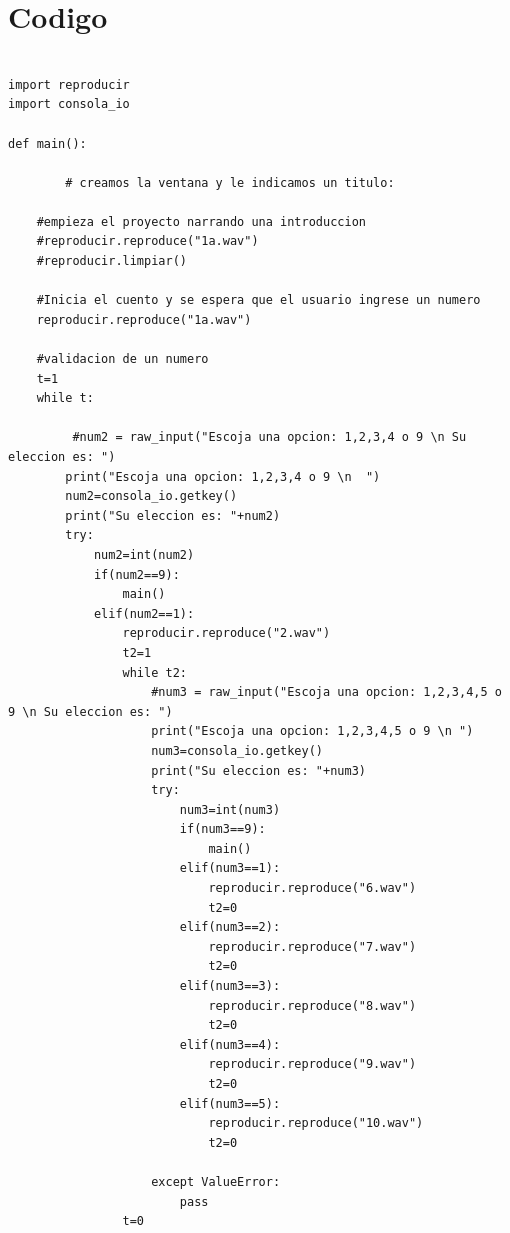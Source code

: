 \section{ Codigo}
 \begin{verbatim}
   
import reproducir
import consola_io

def main():
        
        # creamos la ventana y le indicamos un titulo:
       
	#empieza el proyecto narrando una introduccion
	#reproducir.reproduce("1a.wav")
	#reproducir.limpiar()

	#Inicia el cuento y se espera que el usuario ingrese un numero
	reproducir.reproduce("1a.wav")

	#validacion de un numero
	t=1
	while t:
               
		 #num2 = raw_input("Escoja una opcion: 1,2,3,4 o 9 \n Su eleccion es: ")
		print("Escoja una opcion: 1,2,3,4 o 9 \n  ")
		num2=consola_io.getkey()
		print("Su eleccion es: "+num2)
		try:
			num2=int(num2)
			if(num2==9):
				main()
			elif(num2==1):
				reproducir.reproduce("2.wav")
				t2=1
				while t2:
					#num3 = raw_input("Escoja una opcion: 1,2,3,4,5 o 9 \n Su eleccion es: ")
					print("Escoja una opcion: 1,2,3,4,5 o 9 \n ")					
					num3=consola_io.getkey()
					print("Su eleccion es: "+num3)
					try:
						num3=int(num3)
						if(num3==9):
							main()
						elif(num3==1):
							reproducir.reproduce("6.wav")
							t2=0
						elif(num3==2):
							reproducir.reproduce("7.wav")
							t2=0
						elif(num3==3):		
							reproducir.reproduce("8.wav")
							t2=0
						elif(num3==4):
							reproducir.reproduce("9.wav")
							t2=0
						elif(num3==5):
							reproducir.reproduce("10.wav")
							t2=0
								
					except ValueError:
						pass
				t=0


\end{verbatim}
